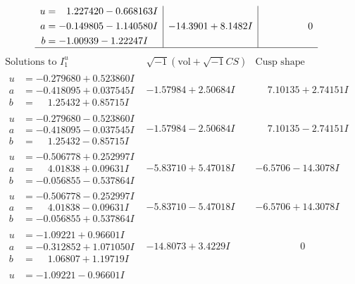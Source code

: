\documentclass[1p]{elsarticle_modified}
\theoremstyle{definition}
\newcommand{\I}{\sqrt{-1}}
\begin{document}
$$\begin{array}{c|c|c}
\begin{aligned}
u &= \phantom{-}1.227420 - 0.668163 I \\
a &= -0.149805 - 1.140580 I \\
b &= -1.00939 - 1.22247 I\end{aligned}
 & -14.3901 + 8.1482 I & \phantom{-0.000000 } 0\\
 \hline 
 \end{array}$$\newpage$$\begin{array}{c|c|c}  
\text{Solutions to }I^u_{1}& \I (\text{vol} + \sqrt{-1}CS) & \text{Cusp shape}\\
 \hline 
\begin{aligned}
u &= -0.279680 + 0.523860 I \\
a &= -0.418095 + 0.037545 I \\
b &= \phantom{-}1.25432 + 0.85715 I\end{aligned}
 & -1.57984 + 2.50684 I & \phantom{-}7.10135 + 2.74151 I \\ \hline\begin{aligned}
u &= -0.279680 - 0.523860 I \\
a &= -0.418095 - 0.037545 I \\
b &= \phantom{-}1.25432 - 0.85715 I\end{aligned}
 & -1.57984 - 2.50684 I & \phantom{-}7.10135 - 2.74151 I \\ \hline\begin{aligned}
u &= -0.506778 + 0.252997 I \\
a &= \phantom{-}4.01838 + 0.09631 I \\
b &= -0.056855 - 0.537864 I\end{aligned}
 & -5.83710 + 5.47018 I & -6.5706 - 14.3078 I \\ \hline\begin{aligned}
u &= -0.506778 - 0.252997 I \\
a &= \phantom{-}4.01838 - 0.09631 I \\
b &= -0.056855 + 0.537864 I\end{aligned}
 & -5.83710 - 5.47018 I & -6.5706 + 14.3078 I \\ \hline\begin{aligned}
u &= -1.09221 + 0.96601 I \\
a &= -0.312852 + 1.071050 I \\
b &= \phantom{-}1.06807 + 1.19719 I\end{aligned}
 & -14.8073 + 3.4229 I & \phantom{-0.000000 } 0 \\ \hline\begin{aligned}
u &= -1.09221 - 0.96601 I \\

\end{aligned}
\end{array}$$
\end{document}
